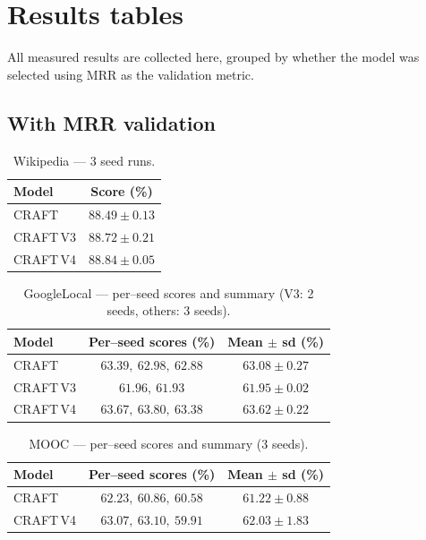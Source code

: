 \documentclass[11pt]{article}
\begin{document}
\clearpage
\section{Results tables}
\label{sec:results-tables}

All measured results are collected here, grouped by whether the model was
selected using MRR as the validation metric.

\subsection{With MRR validation}

\begin{table}[H]
\centering
\caption{Wikipedia --- 3 seed runs.}
\begin{tabular}{lc}
\toprule
Model & Score (\%) \\
\midrule
CRAFT      & $88.49 \pm 0.13$ \\
CRAFT\,V3  & $88.72 \pm 0.21$ \\
CRAFT\,V4  & $\mathbf{88.84 \pm 0.05}$ \\
\bottomrule
\end{tabular}
\end{table}

\begin{table}[H]
\centering
\caption{GoogleLocal --- per--seed scores and summary (V3: 2 seeds, others: 3 seeds).}
\begin{tabular}{lcc}
\toprule
Model & Per--seed scores (\%) & Mean $\pm$ sd (\%) \\
\midrule
CRAFT      & $63.39,\ 62.98,\ 62.88$ & $63.08 \pm 0.27$ \\
CRAFT\,V3  & $61.96,\ 61.93$          & $61.95 \pm 0.02$ \\
CRAFT\,V4  & $63.67,\ 63.80,\ 63.38$  & $\mathbf{63.62 \pm 0.22}$ \\
\bottomrule
\end{tabular}
\end{table}

\begin{table}[H]
\centering
\caption{MOOC --- per--seed scores and summary (3 seeds).}
\begin{tabular}{lcc}
\toprule
Model & Per--seed scores (\%) & Mean $\pm$ sd (\%) \\
\midrule
CRAFT      & $62.23,\ 60.86,\ 60.58$ & $61.22 \pm 0.88$ \\
CRAFT\,V4  & $63.07,\ 63.10,\ 59.91$ & $\mathbf{62.03 \pm 1.83}$ \\
\bottomrule
\end{tabular}
\end{table}
\end{document}
